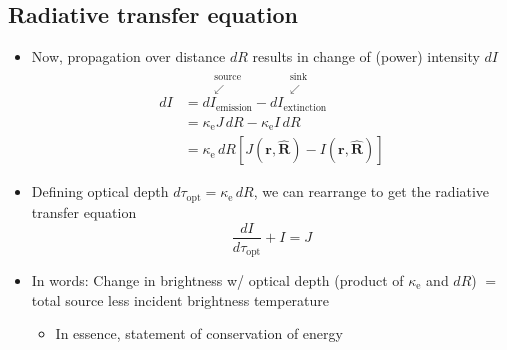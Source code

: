 \documentclass[11pt, oneside]{article}
\newcommand{\ke}{\kappa_\mathrm{e}}
\newcommand{\topt}{\tau_\mathrm{opt}}
\newcommand{\rv}{\mathbf{r}}
\newcommand{\Rh}{\hat{\mathbf{R}}}
\begin{document}
\subsection{Radiative transfer equation}
\label{s:rte}

\begin{itemize}
	\item Now, propagation over distance $dR$ results in change of (power) intensity $dI$
	\begin{align}
		dI &= \overset{\substack{\text{source}\\\swarrow}}{dI_\mathrm{emission}} - \overset{\substack{\text{sink}\\\swarrow}}{dI_\mathrm{extinction}} \nonumber\\
		&= \ke J\,dR - \ke I\,dR \nonumber\\
		&= \ke\,dR\left[J(\rv,\Rh) - I(\rv,\Rh)\right] \label{e:dI}
	\end{align}
	\item Defining optical depth $d\topt = \ke\,dR$, we can rearrange to get the radiative transfer equation
	\begin{equation}
		\label{e:RTE}
		\boxed{\frac{dI}{d\topt} + I = J}
	\end{equation}
	\item[] In words: Change in brightness w/ optical depth (product of $\ke$ and $dR$) $=$ total source less incident brightness temperature
	\begin{itemize}
		\item[$\hookrightarrow$] In essence, statement of conservation of energy
	\end{itemize}
\end{itemize}
\end{document}
